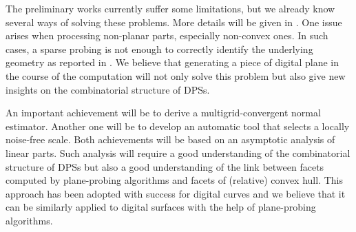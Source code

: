 The preliminary works \cite{LPRTCS2016, LPRDGCI2016, LPRJMIV2017}
currently suffer some limitations, but we already know several ways of
solving these problems. More details will be given in . 
One issue arises when processing non-planar parts, especially non-convex ones.
In such cases, a sparse probing is not enough to correctly identify the underlying geometry
as reported in \cite{LPRJMIV2017}.
We believe that generating a piece of digital plane in the course of the computation will
not only solve this problem but also give new insights on the combinatorial structure
of DPSs. 

An important achievement will be to derive a multigrid-convergent normal estimator.
Another one will be to develop an automatic tool that selects a locally noise-free scale.
Both achievements will be based on an asymptotic analysis of linear parts. Such analysis
will require a good understanding of the combinatorial structure of DPSs
but also a good understanding of the link between facets computed by plane-probing algorithms and
facets of (relative) convex hull. This approach has been adopted with success for digital
curves \cite{Lachaud2012} and we believe that it can be similarly applied to digital
surfaces with the help of plane-probing algorithms.
 
